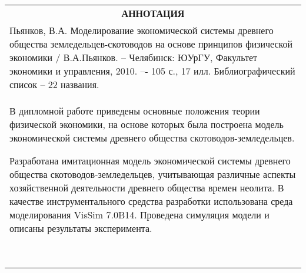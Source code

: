 \thispagestyle{empty}
\newcommand{\wtff}[1]{\tiny{\textit{#1}}}

\begin{tabular}{|l|l|l|l|l|l|l|l|l|l|l|}

	\hline

	\multicolumn{11}{|c|}{\textbf{АННОТАЦИЯ}}\\
	
	\multicolumn{11}{|p{16cm}|}{\hspace{\parindent} \small Пьянков, В.А. Моделирование экономической системы древнего общества земледельцев-скотоводов на основе принципов физической экономики / В.А.Пьянков. -- Челябинск: ЮУрГУ, Факультет экономики и управления, 2010. –- 105 с., 17 илл. Библиографический список -- 22 названия.}\\
	
	\multicolumn{11}{|p{16cm}|}{\hspace{\parindent}  \small
В дипломной работе приведены основные положения теории физической экономики, на основе которых была построена модель экономической системы древнего общества скотоводов-земледельцев.

\hspace{\parindent}
Разработана имитационная  модель экономической системы древнего общества скотоводов-земледельцев, учитывающая различные аспекты хозяйственной деятельности древнего общества времен неолита. В качестве инструментального средства разработки использована среда моделирования VisSim 7.0B14. Проведена симуляция модели и описаны результаты эксперимента.}\\

\multicolumn{11}{|p{16cm}|}{\vspace*{\fill}}\\

\multicolumn{11}{|p{16cm}|}{\vspace*{\fill}}\\

\multicolumn{11}{|p{16cm}|}{\vspace*{\fill}}\\

\multicolumn{11}{|p{16cm}|}{\vspace*{\fill}}\\

\multicolumn{11}{|p{16cm}|}{\vspace*{\fill}}\\

\multicolumn{11}{|p{16cm}|}{\vspace*{\fill}}\\
	

\end{tabular}
